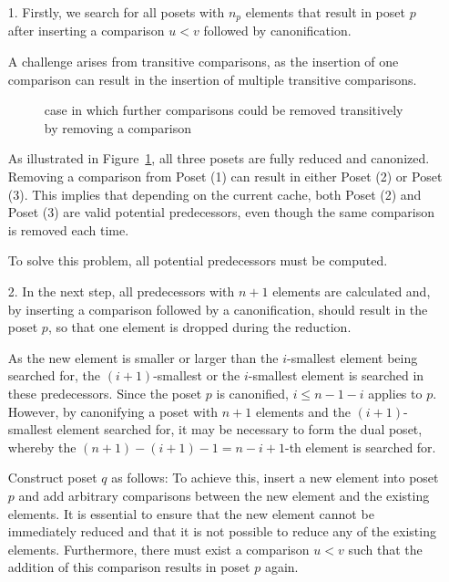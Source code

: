 \documentclass[10pt,journal,compsoc]{IEEEtran}
\begin{document}
\begin{itemize}
  \item[1.]
    Firstly, we search for all posets with $n_p$ elements that result in poset $p$ after inserting a comparison $u < v$ followed by canonification.

    A challenge arises from transitive comparisons, as the insertion of one comparison can result in the insertion of multiple transitive comparisons.

    \begin{figure}
      \centering
      
      \caption{case in which further comparisons could be removed transitively by removing a comparison}
      \label{fig:backward_problematic}
    \end{figure}

    As illustrated in Figure~\ref{fig:backward_problematic}, all three posets are fully reduced and canonized.
    Removing a comparison from Poset (1) can result in either Poset (2) or Poset (3).
    This implies that depending on the current cache, both Poset (2) and Poset (3) are valid potential predecessors, even though the same comparison is removed each time.

    To solve this problem, all potential predecessors must be computed.

  \item[2.]
    In the next step, all predecessors with $n + 1$ elements are calculated and, by inserting a comparison followed by a canonification, should result in the poset $p$, so that one element is dropped during the reduction.

    As the new element is smaller or larger than the $i$-smallest element being searched for, the $(i + 1)$-smallest or the $i$-smallest element is searched in these predecessors. Since the poset $p$ is canonified, $i \leq n - 1 - i$ applies to $p$. However, by canonifying a poset with $n + 1$ elements and the $(i + 1)$-smallest element searched for, it may be necessary to form the dual poset, whereby the $(n + 1) - (i + 1) - 1 = n - i + 1$-th element is searched for.

    Construct poset $q$ as follows:
    To achieve this, insert a new element into poset $p$ and add arbitrary comparisons between the new element and the existing elements.
    It is essential to ensure that the new element cannot be immediately reduced and that it is not possible to reduce any of the existing elements.
    Furthermore, there must exist a comparison $u < v$ such that the addition of this comparison results in poset $p$ again.


\end{itemize}
\end{document}
